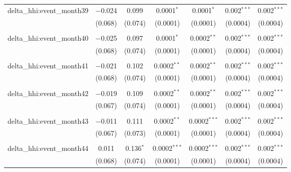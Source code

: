 \begin{table}[H]
{\begin{tabular}{@{\extracolsep{5pt}}lcccccc}
  delta\_hhi:event\_month39 & $-$0.024 & 0.099 & 0.0001$^{*}$ & 0.0001$^{*}$ & 0.002$^{***}$ & 0.002$^{***}$ \\  

   & (0.068) & (0.074) & (0.0001) & (0.0001) & (0.0004) & (0.0004) \\  

   & & & & & & \\  

  delta\_hhi:event\_month40 & $-$0.025 & 0.097 & 0.0001$^{*}$ & 0.0002$^{**}$ & 0.002$^{***}$ & 0.002$^{***}$ \\  

   & (0.068) & (0.074) & (0.0001) & (0.0001) & (0.0004) & (0.0004) \\  

   & & & & & & \\  

  delta\_hhi:event\_month41 & $-$0.021 & 0.102 & 0.0002$^{**}$ & 0.0002$^{**}$ & 0.002$^{***}$ & 0.002$^{***}$ \\  

   & (0.068) & (0.074) & (0.0001) & (0.0001) & (0.0004) & (0.0004) \\  

   & & & & & & \\  

  delta\_hhi:event\_month42 & $-$0.019 & 0.109 & 0.0002$^{**}$ & 0.0002$^{**}$ & 0.002$^{***}$ & 0.002$^{***}$ \\  

   & (0.067) & (0.074) & (0.0001) & (0.0001) & (0.0004) & (0.0004) \\  

   & & & & & & \\  

  delta\_hhi:event\_month43 & $-$0.011 & 0.111 & 0.0002$^{**}$ & 0.0002$^{***}$ & 0.002$^{***}$ & 0.002$^{***}$ \\  

   & (0.067) & (0.073) & (0.0001) & (0.0001) & (0.0004) & (0.0004) \\  

   & & & & & & \\  

  delta\_hhi:event\_month44 & 0.011 & 0.136$^{*}$ & 0.0002$^{***}$ & 0.0002$^{***}$ & 0.002$^{***}$ & 0.002$^{***}$ \\  

   & (0.068) & (0.074) & (0.0001) & (0.0001) & (0.0004) & (0.0004) \\  


\end{tabular}}
\end{table}
